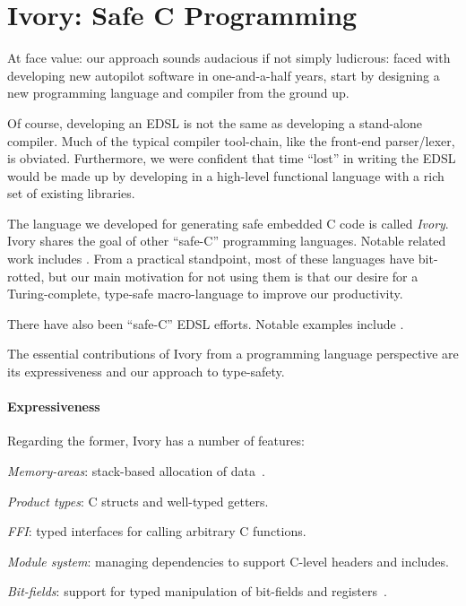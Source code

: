 \section{Ivory: Safe C Programming}
\label{sec:ivory}

At face value: our approach sounds audacious if not simply ludicrous: faced with
developing new autopilot software in one-and-a-half years, start by designing a
new programming language and compiler from the ground up.

Of course, developing an EDSL is not the same as developing a stand-alone
compiler.  Much of the typical compiler tool-chain, like the front-end
parser/lexer, is obviated.  Furthermore, we were confident that time ``lost'' in
writing the EDSL would be made up by developing in a high-level functional
language with a rich set of existing libraries.

The language we developed for generating safe embedded C code is called
\emph{Ivory}.  Ivory shares the goal of other ``safe-C'' programming languages.
Notable related work includes .  From a
practical standpoint, most of these languages have bit-rotted, but our main
motivation for not using them is that our desire for a Turing-complete,
type-safe macro-language to improve our productivity.

There have also been ``safe-C'' EDSL efforts.  Notable examples include
.  

The essential contributions of Ivory from a programming language perspective are
its expressiveness and our approach to type-safety.

\paragraph{Expressiveness}
Regarding the former, Ivory has a number of features:

\begin{compactitem}
  \item \emph{Memory-areas}: stack-based allocation of data~\cite{}.
  \item \emph{Product types}: C structs and well-typed getters.
  \item \emph{FFI}: typed interfaces for calling arbitrary C functions.
  \item \emph{Module system}: managing dependencies to support C-level headers and
    includes.
  \item \emph{Bit-fields}: support for typed manipulation of bit-fields and registers~\cite{}.
\end{compactitem}

